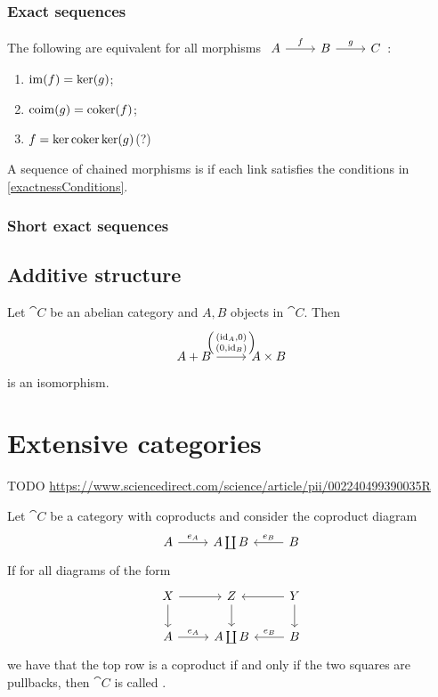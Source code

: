 \subsubsection{Exact sequences}
\begin{proposition} \label{exactnessConditions}
The following are equivalent for all morphisms $\begin{tikzcd}
A \ar[r, "f"] & B \ar[r, "g"] & C
\end{tikzcd}$:
\begin{enumerate}
\item $\operatorname{im}(f) = \ker(g)$;
\item $\operatorname{coim}(g) = \operatorname{coker}(f)$;
\item $f = \ker\operatorname{coker}\ker(g)$(?)
\end{enumerate}
\end{proposition}

\begin{definition}
A sequence of chained morphisms is  if each link satisfies the conditions in \ref{exactnessConditions}.
\end{definition}

\subsubsection{Short exact sequences}

\subsection{Additive structure}

\begin{proposition} \label{biproductIsomorphism}
Let $\cat{C}$ be an abelian category and $A,B$ objects in $\cat{C}$. Then
\[\begin{tikzcd}
A + B \ar[r, "\coprodMorph{(\id_A, 0)}{(0, \id_B)}"] & A\times B
\end{tikzcd} \]
is an isomorphism.
\end{proposition}

\section{Extensive categories}
TODO \url{https://www.sciencedirect.com/science/article/pii/002240499390035R}

\begin{definition}
Let $\cat{C}$ be a category with coproducts and consider the coproduct diagram
\[ \begin{tikzcd}
A \ar[r, "e_A"] & A \coprod B & \ar[l, swap, "e_B"] B
\end{tikzcd} \]
If for all diagrams of the form
\[ \begin{tikzcd}
X \ar[r] \ar[d] & Z \ar[d] & Y \ar[l] \ar[d] \\
A \ar[r, "e_A"] & A \coprod B & \ar[l, swap, "e_B"] B
\end{tikzcd} \]
we have that the top row is a coproduct if and only if the two squares are pullbacks,
then $\cat{C}$ is called .
\end{definition}

